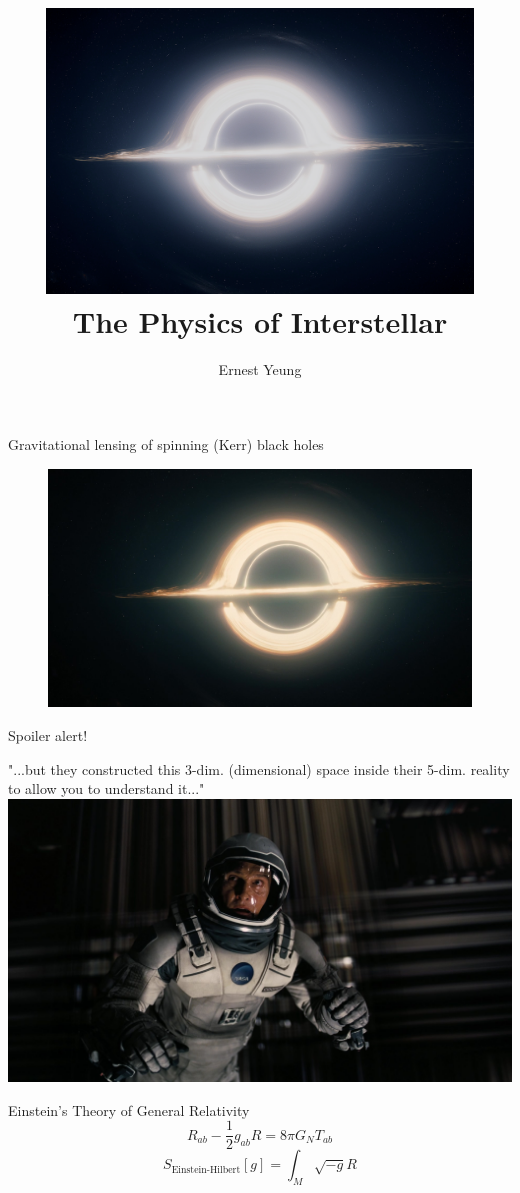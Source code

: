 \documentclass{beamer}
\title{
	\centering\includegraphics[width=0.85\textwidth]{images/ut_interstellarOpener_f.png}\\	
	The Physics of Interstellar
}
\author{Ernest Yeung}
\begin{document}
	\begin{frame}
		\titlepage
	\end{frame}
	\begin{frame}{Gravitational lensing of spinning (Kerr) black holes}
		\begin{figure}
			\includegraphics[width=\textwidth]{images/1200899.jpg}
		\end{figure}
	\end{frame}
	\begin{frame}
		Spoiler alert!
	\end{frame}
	\begin{frame}{"...but they constructed this 3-dim. (dimensional) space inside their 5-dim. reality to allow you to understand it..."}
			\includegraphics[width=\textwidth]{images/1201308.jpg}		
	\end{frame}
	\begin{frame}{Einstein's Theory of General Relativity}
		\begin{equation*}
			R_{ab} - \frac{1}{2} g_{ab} R = 8\pi G_N T_{ab}
		\end{equation*}
		\begin{equation*}
			S_{\text{Einstein-Hilbert}}[g] = \int_M \sqrt{-g} R
		\end{equation*}
	\end{frame}
\end{document}
